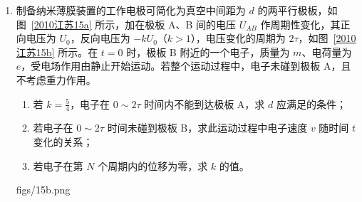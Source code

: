 \documentclass[\gkver]{gaokaozhenti}
\begin{document}
\begin{enumerate}
{\begin{enumerate}
	\item
	$1.2\Um$

	\item
	两人的看法均不正确。当绳长越接近 $1.5\Um$ 时，落点距岸边越远。
\end{enumerate}
}

\item
制备纳米薄膜装置的工作电极可简化为真空中间距为 $d$ 的两平行极板，如图~\ref{2010江苏15a} 所示，加在极板 A、B 间的电压 $U_{AB}$ 作周期性变化，其正向电压为 $U_{0}$，反向电压为 $-kU_{0}$（$k>1$），电压变化的周期为 $2\tau$，如图~\ref{2010江苏15b} 所示。在 $t=0$ 时，极板 B 附近的一个电子，质量为 $m$、电荷量为 $e$，受电场作用由静止开始运动。若整个运动过程中，电子未碰到极板 A，且不考虑重力作用。
\begin{enumerate}
	\item
	若 $k=\frac{5}{4}$，电子在 $0\sim2\tau$ 时间内不能到达极板 A，求 $d$ 应满足的条件；
	\item
	若电子在 $0\sim2\tau$ 时间未碰到极板 B，求此运动过程中电子速度 $v$ 随时间 $t$ 变化的关系；
	\item
	若电子在第 $N$ 个周期内的位移为零，求 $k$ 的值。
\end{enumerate}

{figs/15b.png}


\end{enumerate}
\end{document}
